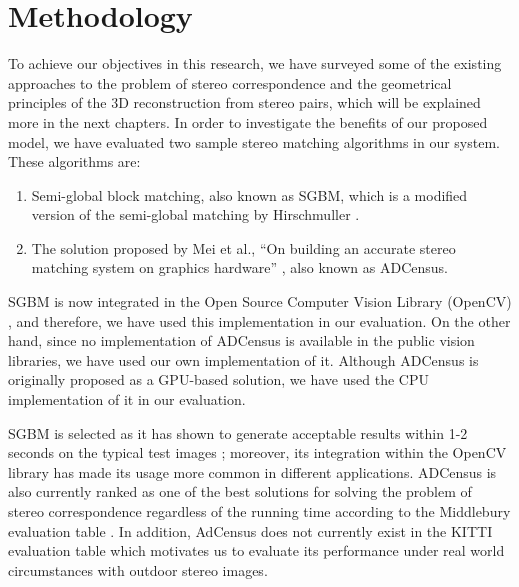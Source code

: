 
\section{Methodology}
To achieve our objectives in this research, we have surveyed some of the existing approaches to the problem 
of stereo correspondence and the geometrical principles of the 3D reconstruction from stereo pairs, which will be explained more 
in the next chapters. 
In order to investigate the benefits of our proposed model, we have evaluated two sample stereo matching algorithms in our system. 
These algorithms are:
\begin{enumerate}
\item Semi-global block matching, also known as SGBM, which is a modified version of the semi-global matching by Hirschmuller \cite{hir08}.
\item The solution  proposed by Mei et al., ``On building an accurate stereo matching system on graphics hardware'' \cite{mei11}, also known as ADCensus.
\end{enumerate}

SGBM is now integrated in the Open Source Computer Vision Library (OpenCV) \cite{sgbm}, and therefore, we have used this implementation
in our evaluation.
On the other hand, since no implementation of ADCensus is available in the public vision libraries, we have used our own implementation of it.
Although ADCensus is originally proposed as a GPU-based solution, we have used the CPU implementation of it in our evaluation.

SGBM is selected as it has shown to generate acceptable results within 1-2 seconds on the typical test images \cite{hir08}; moreover,
its integration within the OpenCV library has made its usage more common in different applications. 
ADCensus is also currently ranked as one of the best solutions 
for solving the problem of stereo correspondence regardless of the running time according to the Middlebury evaluation table \cite{mideval}.
In addition, AdCensus does not currently exist in the KITTI evaluation table which motivates us to evaluate its performance
under real world circumstances with outdoor stereo images.

